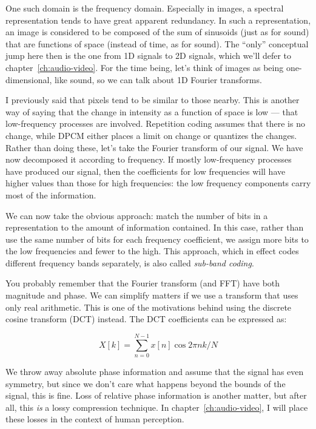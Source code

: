 One such domain is the frequency domain. Especially in images, a
spectral representation tends to have great apparent redundancy.  In
such a representation, an image is considered to be composed of the
sum of sinusoids (just as for sound) that are functions of space
(instead of time, as for sound).  The ``only'' conceptual jump here
then is the one from 1D signals to 2D signals, which we'll defer to
chapter~\ref{ch:audio-video}. For the time being, let's think of
images as being one-dimensional, like sound, so we can talk about 1D
Fourier transforms.

I previously said that pixels tend to be similar to those nearby.
This is another way of saying that the change in intensity as a
function of space is low --- that low-frequency processes are
involved.  Repetition coding assumes that there is no change, while
DPCM either places a limit on change or quantizes the changes. Rather
than doing these, let's take the Fourier transform of our signal. We
have now decomposed it according to frequency. If mostly low-frequency
processes have produced our signal, then the coefficients for low
frequencies will have higher values than those for high
frequencies: the low frequency components carry most of the
information.

We can now take the obvious approach: match the number of bits in a
representation to the amount of information contained.  In this case,
rather than use the same number of bits for each frequency
coefficient, we assign more bits to the low frequencies and fewer to
the high.  This approach, which in effect codes different frequency
bands separately, is also called \emph{sub-band coding}.

You probably remember that the Fourier transform (and FFT) have both
magnitude and phase.  We can simplify matters if we use a transform
that uses only real arithmetic.  This is one of the motivations behind
using the discrete cosine transform (DCT) instead.  The DCT
coefficients can be expressed as:

\begin{equation}
X[k] = \sum_{n=0}^{N-1} x[n] \cos2\pi n k/N
\end{equation}

We throw away absolute phase information and assume that the signal
has even symmetry, but since we don't care what happens beyond the
bounds of the signal, this is fine.  Loss of relative phase
information is another matter, but after all, this \emph{is} a lossy
compression technique. In chapter~\ref{ch:audio-video}, I will place
these losses in the context of human perception.

